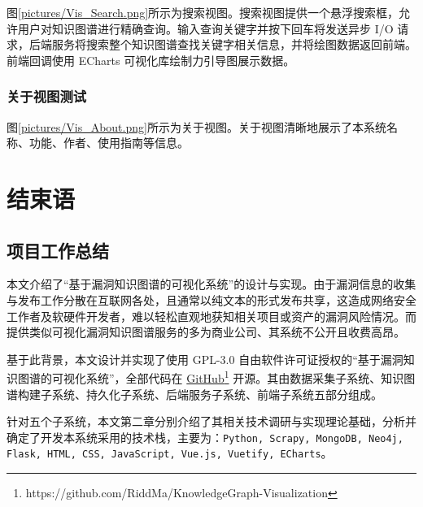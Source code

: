 \documentclass[a4paper,AutoFakeBold,oneside,12pt]{book}
\begin{document}
图\ref{pictures/Vis_Search.png}所示为搜索视图。搜索视图提供一个悬浮搜索框，允许用户对知识图谱进行精确查询。输入查询关键字并按下回车将发送异步 I/O 请求，后端服务将搜索整个知识图谱查找关键字相关信息，并将绘图数据返回前端。前端回调使用 ECharts 可视化库绘制力引导图展示数据。




\subsection{关于视图测试}

图\ref{pictures/Vis_About.png}所示为关于视图。关于视图清晰地展示了本系统名称、功能、作者、使用指南等信息。


\chapter{结束语}

\section{项目工作总结}

本文介绍了``基于漏洞知识图谱的可视化系统''的设计与实现。由于漏洞信息的收集与发布工作分散在互联网各处，且通常以纯文本的形式发布共享，这造成网络安全工作者及软硬件开发者，难以轻松直观地获知相关项目或资产的漏洞风险情况。而提供类似可视化漏洞知识图谱服务的多为商业公司、其系统不公开且收费高昂。

基于此背景，本文设计并实现了使用 GPL-3.0 自由软件许可证授权的``基于漏洞知识图谱的可视化系统''，全部代码在 \href{https://github.com/RiddMa/KnowledgeGraph-Visualization}{GitHub}\footnote{https://github.com/RiddMa/KnowledgeGraph-Visualization} 开源。其由数据采集子系统、知识图谱构建子系统、持久化子系统、后端服务子系统、前端子系统五部分组成。

针对五个子系统，本文第二章分别介绍了其相关技术调研与实现理论基础，分析并确定了开发本系统采用的技术栈，主要为：\lstinline|Python, Scrapy, MongoDB, Neo4j, Flask, HTML, CSS, JavaScript, Vue.js, Vuetify, ECharts|。
\end{document}
